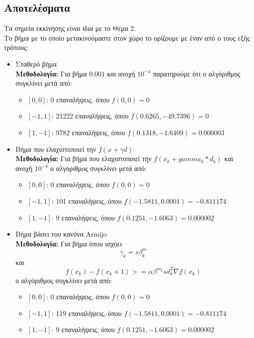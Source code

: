 \documentclass{report}
\begin{document}
\subsection{Αποτελέσματα}
Τα σημεία εκκίνησης είναι ίδια με το Θέμα 2.\\
Το βήμα με το οποίο μετακινούμαστε στον χώρο το ορίζουμε με έναν από ο τους εξής τρόπους:
\begin{itemize}
    \item Σταθερό βήμα\\
    \textbf{Μεθοδολογία:} Για βήμα $0.001$ και ανοχή $10^{-4}$ παρατηρούμε ότι ο αλγόριθμος συγκλίνει
    μετά από:
    \begin{itemize}
        \item \([0,0]\): 0 επαναλήψεις, όπου $f(0,0) = 0$
        \item \([-1,1]\): 21222 επαναλήψεις, όπου $f(0.6265, -49.7396) = 0$
        \item \([1,-1]\): 9782 επαναλήψεις, όπου $f(0.1318, -1.6409) = 0.000003$
    \end{itemize}
    
    \item Βήμα που ελαχιστοποιεί την $f(x + γd)$\\
    \textbf{Μεθοδολογία:} Για βήμα που ελαχιστοποιεί την $f(x_k + gamma_k * d_k)$ και ανοχή $10^{-4}$
    ο αλγόριθμος συγκλίνει μετά από:
    \begin{itemize}
        \item \([0,0]\): 0 επαναλήψεις, όπου $f(0,0) = 0$
        \item \([-1,1]\): 101 επαναλήψεις, όπου $f(-1.5811, 0.0001) = -0.811174$
        \item \([1,-1]\): 9 επαναλήψεις, όπου $f(0.1251, -1.6063) = 0.000002$
    \end{itemize}
    \item Βήμα βάσει του κανόνα Armijo\\
    \textbf{Μεθοδολογία:} Για βήμα όπου ισχύει\\
    $$γ_k = s \beta^m_k$$ και 
    $$f(x_k)-f(x_k+1)>=\alpha \beta^{m_k} s d_k^T \nabla f(x_k)$$
    ο αλγόριθμος συγκλίνει μετά από:
    \begin{itemize}
        \item \([0,0]\): 0 επαναλήψεις, όπου $f(0,0) = 0$
        \item \([-1,1]\): 119 επαναλήψεις, όπου $f(-1.5811, 0.0001) = -0.811174$
        \item \([1,-1]\): 9 επαναλήψεις, όπου $f(0.1251, -1.6063) = 0.000002$
    \end{itemize}
\end{itemize}
\end{document}
